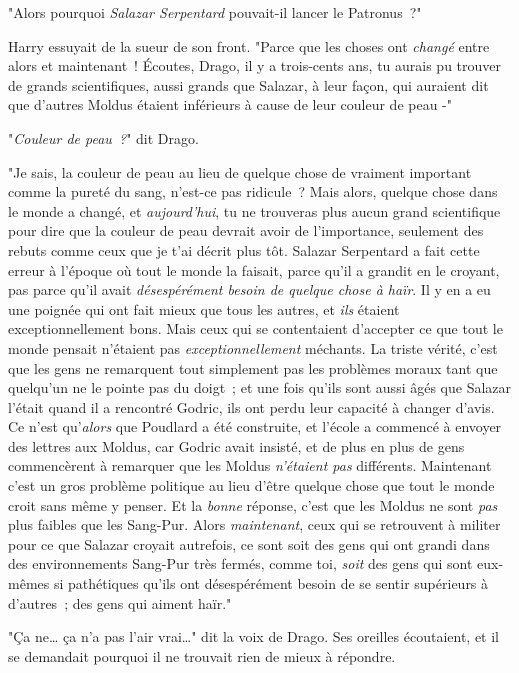 "Alors pourquoi \emph{Salazar Serpentard} pouvait-il lancer le Patronus~?"

Harry essuyait de la sueur de son front. "Parce que les choses ont \emph{changé} entre alors et maintenant~! Écoutes, Drago, il y a trois-cents ans, tu aurais pu trouver de grands scientifiques, aussi grands que Salazar, à leur façon, qui auraient dit que d'autres Moldus étaient inférieurs à cause de leur couleur de peau -"

"\emph{Couleur de peau~?}" dit Drago.

"Je sais, la couleur de peau au lieu de quelque chose de vraiment important comme la pureté du sang, n'est-ce pas ridicule~? Mais alors, quelque chose dans le monde a changé, et \emph{aujourd'hui}, tu ne trouveras plus aucun grand scientifique pour dire que la couleur de peau devrait avoir de l'importance, seulement des rebuts comme ceux que je t'ai décrit plus tôt. Salazar Serpentard a fait cette erreur à l'époque où tout le monde la faisait, parce qu'il a grandit en le croyant, pas parce qu'il avait \emph{désespérément besoin de quelque chose à haïr}. Il y en a eu une poignée qui ont fait mieux que tous les autres, et \emph{ils} étaient exceptionnellement bons. Mais ceux qui se contentaient d'accepter ce que tout le monde pensait n'étaient pas \emph{exceptionnellement} méchants. La triste vérité, c'est que les gens ne remarquent tout simplement pas les problèmes moraux tant que quelqu'un ne le pointe pas du doigt~; et une fois qu'ils sont aussi âgés que Salazar l'était quand il a rencontré Godric, ils ont perdu leur capacité à changer d'avis. Ce n'est qu'\emph{alors} que Poudlard a été construite, et l'école a commencé à envoyer des lettres aux Moldus, car Godric avait insisté, et de plus en plus de gens commencèrent à remarquer que les Moldus \emph{n'étaient pas} différents. Maintenant c'est un gros problème politique au lieu d'être quelque chose que tout le monde croit sans même y penser. Et la \emph{bonne} réponse, c'est que les Moldus ne sont \emph{pas} plus faibles que les Sang-Pur. Alors \emph{maintenant}, ceux qui se retrouvent à militer pour ce que Salazar croyait autrefois, ce sont soit des gens qui ont grandi dans des environnements Sang-Pur très fermés, comme toi, \emph{soit} des gens qui sont eux-mêmes si pathétiques qu'ils ont désespérément besoin de se sentir supérieurs à d'autres~; des gens qui aiment haïr."

"Ça ne… ça n'a pas l'air vrai…" dit la voix de Drago. Ses oreilles écoutaient, et il se demandait pourquoi il ne trouvait rien de mieux à répondre.

